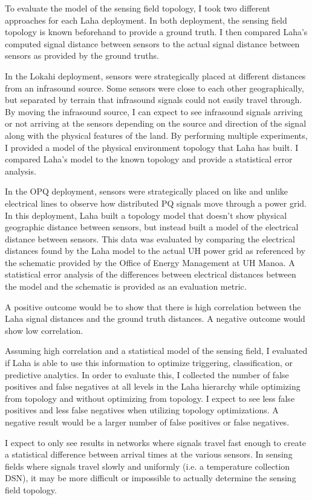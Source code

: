 To evaluate the model of the sensing field topology, I took two different approaches for each Laha deployment. In both deployment, the sensing field topology is known beforehand to provide a ground truth. I then compared Laha's computed signal distance between sensors to the actual signal distance between sensors as provided by the ground truths.

In the Lokahi deployment, sensors were strategically placed at different distances from an infrasound source. Some sensors were close to each other geographically, but separated by terrain that infrasound signals could not easily travel through. By moving the infrasound source, I can expect to see infrasound signals arriving or not arriving at the sensors depending on the source and direction of the signal along with the physical features of the land. By performing multiple experiments, I provided a model of the physical environment topology that Laha has built. I compared Laha's model to the known topology and provide a statistical error analysis.

In the OPQ deployment, sensors were strategically placed on like and unlike electrical lines to observe how distributed PQ signals move through a power grid. In this deployment, Laha built a topology model that doesn't show physical geographic distance between sensors, but instead built a model of the electrical distance between sensors. This data was evaluated by comparing the electrical distances found by the Laha model to the actual UH power grid as referenced by the schematic provided by the Office of Energy Management at UH Manoa. A statistical error analysis of the differences between electrical distances between the model and the schematic is provided as an evaluation metric.

A positive outcome would be to show that there is high correlation between the Laha signal distances and the ground truth distances. A negative outcome would show low correlation.

Assuming high correlation and a statistical model of the sensing field, I evaluated if Laha is able to use this information to optimize triggering, classification, or predictive analytics. In order to evaluate this, I collected the number of false positives and false negatives at all levels in the Laha hierarchy while optimizing from topology and without optimizing from topology. I expect to see less false positives and less false negatives when utilizing topology optimizations. A negative result would be a larger number of false positives or false negatives.

I expect to only see results in networks where signals travel fast enough to create a statistical difference between arrival times at the various sensors. In sensing fields where signals travel slowly and uniformly (i.e. a temperature collection DSN), it may be more difficult or impossible to actually determine the sensing field topology.
